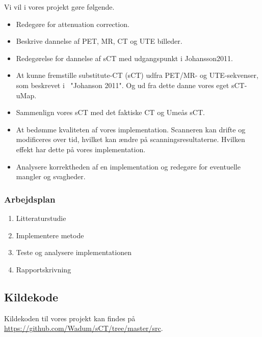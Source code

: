 Vi vil i vores projekt gøre følgende.
\begin{itemize}
    \item Redegøre for attenuation correction.
    \item Beskrive dannelse af PET, MR, CT og UTE billeder.
    \item Redegørelse for dannelse af sCT med udgangspunkt i Johansson2011.
    \item At kunne fremstille substitute-CT (sCT) udfra PET/MR- og
        UTE-sekvenser,
        som beskrevet i ~"Johanson 2011". Og ud fra dette danne vores eget 
        sCT-uMap.
    \item Sammenlign vores sCT med det faktiske CT og Umeås sCT.
    \item At bedømme kvaliteten af vores implementation. 
Scanneren kan drifte og modificeres over tid, hvilket kan ændre på
scanningsresultaterne. Hvilken effekt har dette på vores implementation.
    \item Analysere korrektheden af en implementation og redegøre for
        eventuelle mangler og svagheder.
\end{itemize}

\subsubsection{Arbejdsplan}
\begin{enumerate}
    \item Litteraturstudie 
    \item Implementere metode
    \item Teste og analysere implementationen
    \item Rapportskrivning
\end{enumerate}

\begin{gantt}{5}{16}
    \begin{ganttitle}
    \end{ganttitle}
\end{gantt}

\newpage

\subsection{Kildekode}

Kildekoden til vores projekt kan findes på \url{https://github.com/Wadum/sCT/tree/master/src}.